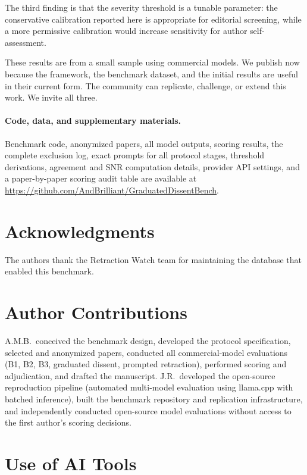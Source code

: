 \documentclass[11pt]{article}
\begin{document}
The third finding is that the severity threshold is a tunable parameter: the conservative calibration reported here is appropriate for editorial screening, while a more permissive calibration would increase sensitivity for author self-assessment.

These results are from a small sample using commercial models. We publish now because the framework, the benchmark dataset, and the initial results are useful in their current form. The community can replicate, challenge, or extend this work. We invite all three.

\paragraph{Code, data, and supplementary materials.} Benchmark code, anonymized papers, all model outputs, scoring results, the complete exclusion log, exact prompts for all protocol stages, threshold derivations, agreement and SNR computation details, provider API settings, and a paper-by-paper scoring audit table are available at \url{https://github.com/AndBrilliant/GraduatedDissentBench}.

\section*{Acknowledgments}

The authors thank the Retraction Watch team for maintaining the database that enabled this benchmark.

\section*{Author Contributions}

A.M.B.\ conceived the benchmark design, developed the protocol specification, selected and anonymized papers, conducted all commercial-model evaluations (B1, B2, B3, graduated dissent, prompted retraction), performed scoring and adjudication, and drafted the manuscript. J.R.\ developed the open-source reproduction pipeline (automated multi-model evaluation using llama.cpp with batched inference), built the benchmark repository and replication infrastructure, and independently conducted open-source model evaluations without access to the first author's scoring decisions.

\section*{Use of AI Tools}
\end{document}
